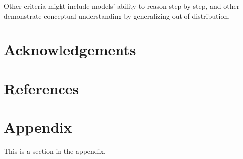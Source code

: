 \documentclass[11pt]{article}
\begin{document}
Other criteria might include models' ability to reason step by step, 
and other demonstrate conceptual understanding by generalizing 
out of distribution. 

\section{Acknowledgements}

\section{References}




\appendix

\section{Appendix}
\label{sec:appendix}

This is a section in the appendix.
\end{document}
